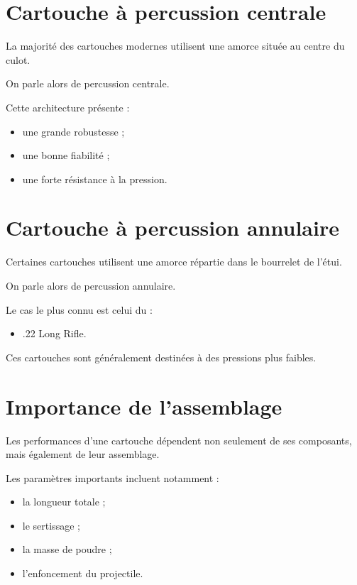 \section{Cartouche à percussion centrale}

La majorité des cartouches modernes utilisent une amorce située au centre du
culot.

On parle alors de percussion centrale.

Cette architecture présente :

\begin{itemize}
    \item une grande robustesse ;
    \item une bonne fiabilité ;
    \item une forte résistance à la pression.
\end{itemize}

\section{Cartouche à percussion annulaire}

Certaines cartouches utilisent une amorce répartie dans le bourrelet de
l'étui.

On parle alors de percussion annulaire.

Le cas le plus connu est celui du :

\begin{itemize}
    \item .22 Long Rifle.
\end{itemize}

Ces cartouches sont généralement destinées à des pressions plus faibles.

\section{Importance de l'assemblage}

Les performances d'une cartouche dépendent non seulement de ses composants,
mais également de leur assemblage.

Les paramètres importants incluent notamment :

\begin{itemize}
    \item la longueur totale ;
    \item le sertissage ;
    \item la masse de poudre ;
    \item l'enfoncement du projectile.
\end{itemize}

